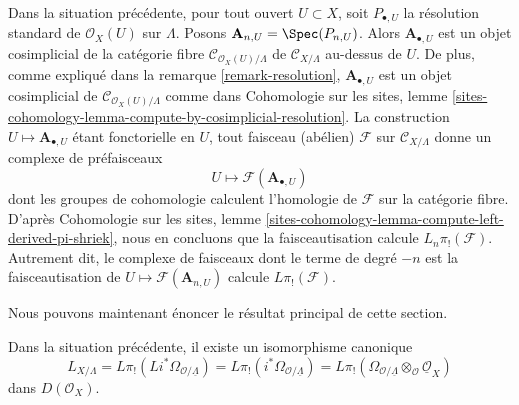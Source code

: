 \begin{remark}
\label{remark-compute-L-pi-shriek}
Dans la situation précédente, pour tout ouvert $U \subset X$, soit
$P_{\bullet, U}$ la résolution standard de $\mathcal{O}_X(U)$ sur $\Lambda$.
Posons $\mathbf{A}_{n, U} = \Spec(P_{n, U})$. Alors
$\mathbf{A}_{\bullet, U}$
est un objet cosimplicial de la catégorie fibre
$\mathcal{C}_{\mathcal{O}_X(U)/\Lambda}$ de $\mathcal{C}_{X/\Lambda}$ au-dessus
de $U$. De plus, comme expliqué dans la remarque \ref{remark-resolution},
$\mathbf{A}_{\bullet, U}$ est un objet cosimplicial de
$\mathcal{C}_{\mathcal{O}_X(U)/\Lambda}$ comme dans Cohomologie sur les sites,
lemme \ref{sites-cohomology-lemma-compute-by-cosimplicial-resolution}. La
construction $U \mapsto \mathbf{A}_{\bullet, U}$ étant fonctorielle en $U$,
tout faisceau (abélien) $\mathcal{F}$ sur $\mathcal{C}_{X/\Lambda}$ donne un
complexe de préfaisceaux
$$
U \longmapsto \mathcal{F}(\mathbf{A}_{\bullet, U})
$$
dont les groupes de cohomologie calculent l'homologie de $\mathcal{F}$ sur la
catégorie fibre. D'après Cohomologie sur les sites, lemme
\ref{sites-cohomology-lemma-compute-left-derived-pi-shriek}, nous en concluons
que la faisceautisation calcule $L_n\pi_!(\mathcal{F})$. Autrement dit, le
complexe de faisceaux dont le terme de degré $-n$ est la faisceautisation de
$U \mapsto \mathcal{F}(\mathbf{A}_{n, U})$ calcule $L\pi_!(\mathcal{F})$.
\end{remark}

\noindent
Nous pouvons maintenant énoncer le résultat principal de cette section.

\begin{lemma}
\label{lemma-cotangent-morphism-schemes}
Dans la situation précédente, il existe un isomorphisme canonique
$$
L_{X/\Lambda} = 
L\pi_!(Li^*\Omega_{\mathcal{O}/\underline{\Lambda}}) =
L\pi_!(i^*\Omega_{\mathcal{O}/\underline{\Lambda}}) =
L\pi_!(\Omega_{\mathcal{O}/\underline{\Lambda}}
\otimes_\mathcal{O} \underline{\mathcal{O}}_X)
$$
dans $D(\mathcal{O}_X)$.
\end{lemma}

